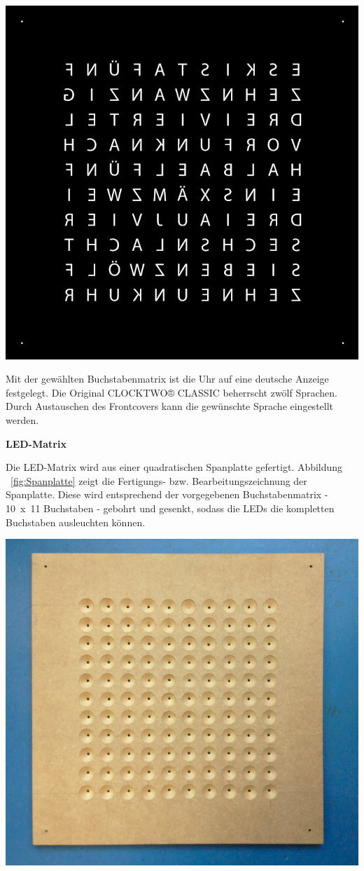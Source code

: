 \begin{multicols}{2}
{
\centering\includegraphics[width=0.75\columnwidth]{Abbildungen/Konstruktion/Buchstaben}

}
Mit der gewählten Buchstabenmatrix ist die Uhr auf eine deutsche Anzeige festgelegt. Die Original CLOCKTWO® CLASSIC beherrscht zwölf Sprachen. Durch Austauschen des Frontcovers kann die gewünschte Sprache eingestellt werden. 

\textbf{LED-Matrix}

Die LED-Matrix wird aus einer quadratischen Spanplatte gefertigt. Abbildung ~\ref{fig:Spanplatte} zeigt die Fertigungs- bzw. Bearbeitungszeichnung der Spanplatte. Diese wird entsprechend der vorgegebenen Buchstabenmatrix -  10~x~11 Buchstaben - gebohrt und gesenkt, sodass die LEDs die kompletten Buchstaben ausleuchten können. 

{
\centering\includegraphics[width=0.85\columnwidth]{Abbildungen/Konstruktion/Platte01}

}
\end{multicols}
